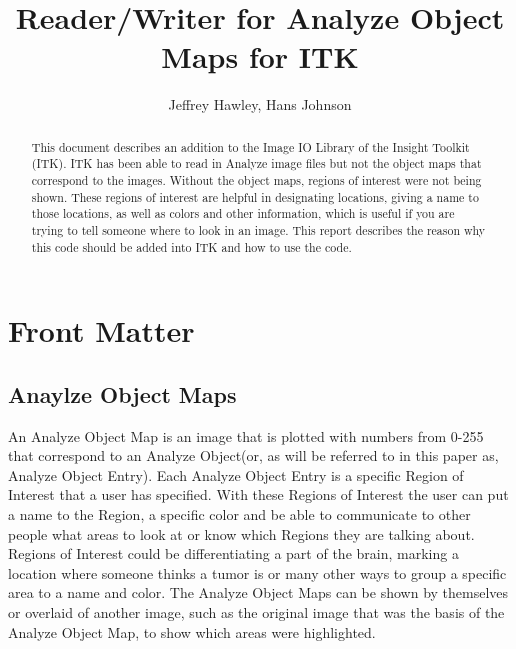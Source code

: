 \documentclass{InsightArticle}
\title{Reader/Writer for Analyze Object Maps for ITK}
\author{Jeffrey Hawley, Hans Johnson }
\begin{document}
\ifpdf
\else
\fi


\maketitle


\ifhtml
\chapter*{Front Matter\label{front}}
\fi


\begin{abstract}
\noindent
This document describes an addition to the Image IO Library of the Insight Toolkit (ITK).
ITK has been able to read in Analyze image files but not the object maps that correspond
to the images.  Without the object maps, regions of interest were not being shown.
These regions of interest are helpful in designating locations, giving a name to those
locations, as well as colors and other information, which is useful if you are trying to tell
someone where to look in an image.  This report describes the reason why this code should be
added into ITK and how to use the code.
\end{abstract}

\tableofcontents

\section{Anaylze Object Maps}
An Analyze Object Map is an image that is plotted with numbers from 0-255 that correspond to an Analyze Object(or, as will be referred to in this paper as, Analyze Object Entry).  Each Analyze Object Entry
is a specific Region of Interest that a user has specified. With these Regions of Interest the user can put a name to the Region, a specific color and be able to communicate to other people what areas to look at or know which Regions they are talking about.  Regions of Interest could be differentiating a part of the brain, marking a location where someone thinks a tumor is or many other ways to group a specific area to a name and color.  The Analyze Object Maps can be shown by themselves or overlaid of another image, such as the original image that was the basis of the Analyze Object Map, to show which areas were highlighted.  
  
\end{document}
